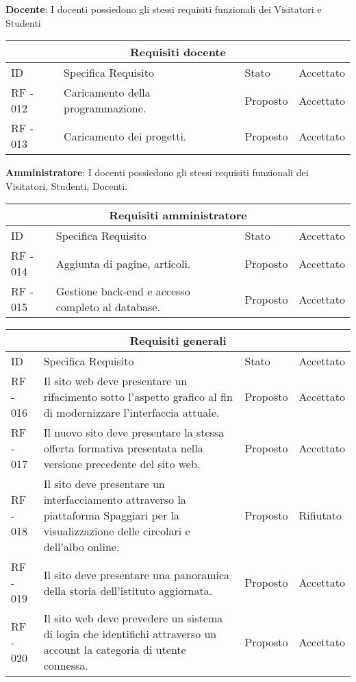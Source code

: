 \documentclass{article}
\begin{document}
	\item \textbf{Docente}: I docenti possiedono gli stessi requisiti funzionali dei Visitatori e Studenti
	\begin{tabular}{ |p{1cm}|p{4cm}|p{3cm}|p{2cm}|  }
		\hline
		\multicolumn{4}{|c|}{Requisiti docente} \\
		\hline
		ID& Specifica Requisito &Stato&Accettato\\
		\hline
		RF - 012& Caricamento della programmazione. &Proposto&Accettato\\
		\hline
		RF - 013& Caricamento dei progetti. &Proposto&Accettato\\
		\hline
	\end{tabular}
	\item \textbf{Amministratore}: I docenti possiedono gli stessi requisiti funzionali dei Visitatori, Studenti, Docenti.
	\begin{tabular}{ |p{1cm}|p{4cm}|p{3cm}|p{2cm}|  }
		\hline
		\multicolumn{4}{|c|}{Requisiti amministratore} \\
		\hline
		ID& Specifica Requisito &Stato&Accettato\\
		\hline
		RF - 014& Aggiunta di pagine, articoli. &Proposto&Accettato\\
		\hline
		RF - 015& Gestione back-end e accesso completo al database. &Proposto&Accettato\\
		\hline
	\end{tabular}
	\begin{tabular}{ |p{1cm}|p{4cm}|p{3cm}|p{2cm}|  }
		\hline
		\multicolumn{4}{|c|}{Requisiti generali} \\
		\hline
		ID& Specifica Requisito &Stato&Accettato\\
		\hline
		RF - 016& Il sito web deve presentare un rifacimento sotto l'aspetto grafico al fin di modernizzare l'interfaccia attuale. &Proposto&Accettato\\
		\hline
		RF - 017& Il nuovo sito deve presentare la stessa offerta formativa presentata nella versione precedente del sito web. &Proposto&Accettato\\
		\hline
		RF - 018& Il sito deve presentare un interfacciamento attraverso la piattaforma Spaggiari per la visualizzazione delle circolari e dell'albo online. &Proposto&Rifiutato\\
		\hline
		RF - 019& Il sito deve presentare una panoramica della storia dell'istituto aggiornata. &Proposto&Accettato\\
		\hline
		RF - 020& Il sito web deve prevedere un sistema di login che identifichi attraverso un account la categoria di utente connessa. &Proposto&Accettato\\
		\hline
	\end{tabular}
\end{document}
